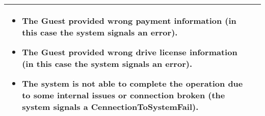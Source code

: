 \begin{center}
\begin{tabular}{ l | p{12cm} }
\begin{itemize}
\item The Guest provided wrong payment information (in this case the system signals an error).
\item The Guest provided wrong drive license information (in this case the system signals an error).
\item The system is not able to complete the operation due to some internal issues or connection broken (the system signals a CennectionToSystemFail).%
\end{itemize} \\ \hline
  \end{tabular}
\end{center}